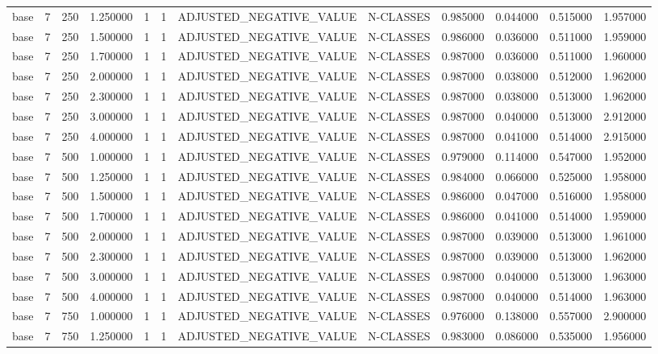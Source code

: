 \begin{tabular}{lrrrllllrrrr}
base & 7 & 250 & 1.250000 & 1 & 1 & ADJUSTED_NEGATIVE_VALUE & N-CLASSES & 0.985000 & 0.044000 & 0.515000 & 1.957000 \\
base & 7 & 250 & 1.500000 & 1 & 1 & ADJUSTED_NEGATIVE_VALUE & N-CLASSES & 0.986000 & 0.036000 & 0.511000 & 1.959000 \\
base & 7 & 250 & 1.700000 & 1 & 1 & ADJUSTED_NEGATIVE_VALUE & N-CLASSES & 0.987000 & 0.036000 & 0.511000 & 1.960000 \\
base & 7 & 250 & 2.000000 & 1 & 1 & ADJUSTED_NEGATIVE_VALUE & N-CLASSES & 0.987000 & 0.038000 & 0.512000 & 1.962000 \\
base & 7 & 250 & 2.300000 & 1 & 1 & ADJUSTED_NEGATIVE_VALUE & N-CLASSES & 0.987000 & 0.038000 & 0.513000 & 1.962000 \\
base & 7 & 250 & 3.000000 & 1 & 1 & ADJUSTED_NEGATIVE_VALUE & N-CLASSES & 0.987000 & 0.040000 & 0.513000 & 2.912000 \\
base & 7 & 250 & 4.000000 & 1 & 1 & ADJUSTED_NEGATIVE_VALUE & N-CLASSES & 0.987000 & 0.041000 & 0.514000 & 2.915000 \\
base & 7 & 500 & 1.000000 & 1 & 1 & ADJUSTED_NEGATIVE_VALUE & N-CLASSES & 0.979000 & 0.114000 & 0.547000 & 1.952000 \\
base & 7 & 500 & 1.250000 & 1 & 1 & ADJUSTED_NEGATIVE_VALUE & N-CLASSES & 0.984000 & 0.066000 & 0.525000 & 1.958000 \\
base & 7 & 500 & 1.500000 & 1 & 1 & ADJUSTED_NEGATIVE_VALUE & N-CLASSES & 0.986000 & 0.047000 & 0.516000 & 1.958000 \\
base & 7 & 500 & 1.700000 & 1 & 1 & ADJUSTED_NEGATIVE_VALUE & N-CLASSES & 0.986000 & 0.041000 & 0.514000 & 1.959000 \\
base & 7 & 500 & 2.000000 & 1 & 1 & ADJUSTED_NEGATIVE_VALUE & N-CLASSES & 0.987000 & 0.039000 & 0.513000 & 1.961000 \\
base & 7 & 500 & 2.300000 & 1 & 1 & ADJUSTED_NEGATIVE_VALUE & N-CLASSES & 0.987000 & 0.039000 & 0.513000 & 1.962000 \\
base & 7 & 500 & 3.000000 & 1 & 1 & ADJUSTED_NEGATIVE_VALUE & N-CLASSES & 0.987000 & 0.040000 & 0.513000 & 1.963000 \\
base & 7 & 500 & 4.000000 & 1 & 1 & ADJUSTED_NEGATIVE_VALUE & N-CLASSES & 0.987000 & 0.040000 & 0.514000 & 1.963000 \\
base & 7 & 750 & 1.000000 & 1 & 1 & ADJUSTED_NEGATIVE_VALUE & N-CLASSES & 0.976000 & 0.138000 & 0.557000 & 2.900000 \\
base & 7 & 750 & 1.250000 & 1 & 1 & ADJUSTED_NEGATIVE_VALUE & N-CLASSES & 0.983000 & 0.086000 & 0.535000 & 1.956000 \\

\end{tabular}
